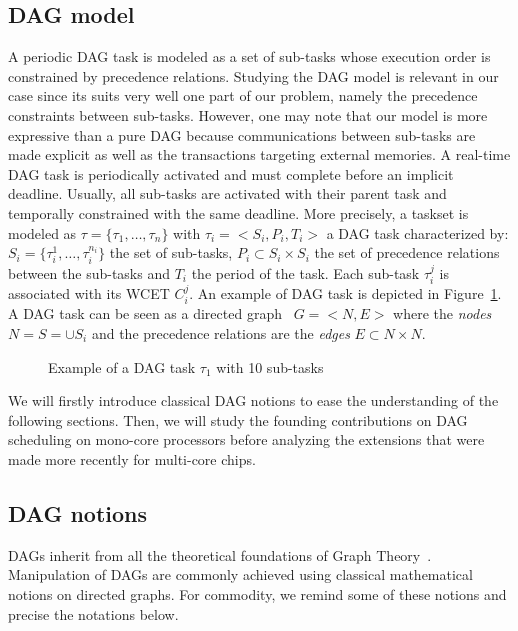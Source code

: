 \documentclass[main.tex]{subfiles}
\begin{document}
\subsection{DAG model}
 A periodic DAG task is modeled as a set of sub-tasks whose execution order is constrained by precedence relations. Studying the DAG model is relevant in our case since its suits very well one part of our problem, namely the precedence constraints between sub-tasks. However, one may note that our model is more expressive than a pure DAG because communications between sub-tasks are made explicit as well as the transactions targeting external memories. A real-time DAG task is periodically activated and must complete before an implicit deadline. Usually, all sub-tasks are activated with their parent task and temporally constrained with the same deadline. More precisely, a taskset is modeled as $\tau = \{ \tau_1 , \ldots , \tau_n \}$ with $\tau_i = <S_i, P_i, T_i>$ a DAG task characterized by:
        $S_i = \{ \tau_i^1 , \ldots , \tau_i^{n_i} \}$ the set of sub-tasks, 
        $P_i \subset S_i \times S_i$ the set of precedence relations between the sub-tasks and 
        $T_i$ the period of the task. Each sub-task $\tau_i^j$ is associated with its WCET $C_i^j$. An example of DAG task is depicted in Figure~\ref{fig_stateOfTheArt_2_DAGTask}. A DAG task can be seen as a directed graph~\cite{BangJensen2008} $G = <N,E>$ where the \emph{nodes} $N = S = \cup S_i$ and the precedence relations are the \emph{edges} $E \subset N \times N$.

\begin{figure}
    \centering
    
    \caption{Example of a DAG task $\tau_1$ with 10 sub-tasks}
    \label{fig_stateOfTheArt_2_DAGTask}
\end{figure}


We will firstly introduce classical DAG notions to ease the understanding of the following sections. Then, we will study the founding contributions on DAG scheduling on mono-core processors before analyzing the extensions that were made more recently for multi-core chips.

\subsection{DAG notions}
DAGs inherit from all the theoretical foundations of Graph Theory~\cite{BangJensen2008}. Manipulation of DAGs are commonly achieved using classical mathematical notions on directed graphs. For commodity, we remind some of these notions and precise the notations below.
\end{document}
